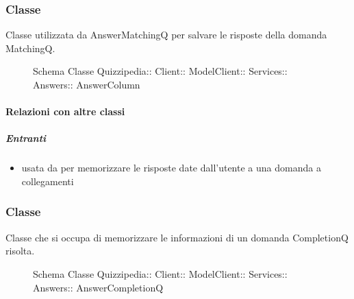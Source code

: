 \subsubsection{Classe }
Classe utilizzata da AnswerMatchingQ per salvare le risposte della domanda MatchingQ.
\begin{figure}[H]
\centering
\noindent{}
\caption[Schema Classe AnswerColumn]{Schema Classe Quizzipedia:: Client:: ModelClient:: Services:: Answers:: AnswerColumn}
\end{figure}
\paragraph{Relazioni con altre classi}
\subparagraph{Entranti}
\begin{itemize}
\item usata da  per memorizzare le risposte date dall'utente a una domanda a collegamenti
\end{itemize}
\subsubsection{Classe }
Classe che si occupa di memorizzare le informazioni di un domanda CompletionQ risolta.
\begin{figure}[H]
\centering
\noindent{}
\caption[Schema Classe AnswerCompletionQ]{Schema Classe Quizzipedia:: Client:: ModelClient:: Services:: Answers:: AnswerCompletionQ}
\end{figure}
